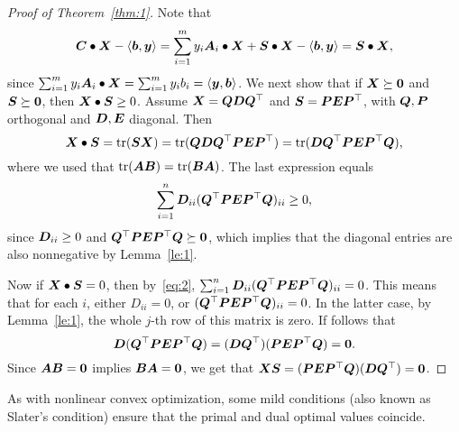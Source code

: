 \begin{proof}[Proof of Theorem~\ref{thm:1}]
Note that
\begin{equation*}
 \bm{C}\bullet\bm{X}-\langle {\bm{b}}, {\bm{y}} \rangle=\sum_{i=1}^m y_i \bm{A}_i\bullet \bm{X}+\bm{S}\bullet \bm{X}-\langle {\bm{b}}, {\bm{y}} \rangle = \bm{S}\bullet \bm{X},
\end{equation*}
since $\sum_{i=1}^m y_i \bm{A}_i\bullet \bm{X}=\sum_{i=1}^m y_ib_i=\langle {\bm{y}}, {\bm{b}} \rangle$.
 We next show that if $\bm{X}\succeq \bm{0}$ and $\bm{S}\succeq \bm{0}$, then $\bm{X}\bullet \bm{S}\geq 0$. Assume $\bm{X}=\bm{Q}\bm{D}\bm{Q}^{\top}$ and $\bm{S}=\bm{P}\bm{E}\bm{P}^{\top}$, with $\bm{Q},\bm{P}$ orthogonal and $\bm{D},\bm{E}$ diagonal. Then
 \begin{equation*}
  \bm{X}\bullet \bm{S} = \mathrm{tr}(\bm{S}\bm{X}) = \mathrm{tr}(\bm{Q}\bm{D}\bm{Q}^{\top}\bm{P}\bm{E}\bm{P}^{\top}) = \mathrm{tr}(\bm{D}\bm{Q}^{\top}\bm{PE}\bm{P}^{\top}\bm{Q}),
 \end{equation*}
where we used that $\mathrm{tr}(\bm{A}\bm{B})=\mathrm{tr}(\bm{B}\bm{A})$. The last expression equals 
\begin{equation}\label{eq:2}
 \sum_{i=1}^n \bm{D}_{ii} (\bm{Q}^{\top}\bm{PE}\bm{P}^{\top}\bm{Q})_{ii}\geq 0,
\end{equation}
since $\bm{D}_{ii}\geq 0$ and $\bm{Q}^{\top}\bm{PE}\bm{P}^{\top}\bm{Q}\succeq \bm{0}$, which implies that the diagonal entries are also nonnegative by Lemma~\ref{le:1}.

Now if $\bm{X}\bullet \bm{S}=0$, then by~\eqref{eq:2}, $\sum_{i=1}^n \bm{D}_{ii} (\bm{Q}^{\top}\bm{PE}\bm{P}^{\top}\bm{Q})_{ii}=0$. This means that for each $i$, either $D_{ii}=0$, or $(\bm{Q}^{\top}\bm{PE}\bm{P}^{\top}\bm{Q})_{ii}=0$. In the latter case, by Lemma~\ref{le:1}, the whole $j$-th row of this matrix is zero. If follows that
\begin{equation*}
 \bm{D}(\bm{Q}^{\top}\bm{PE}\bm{P}^{\top}\bm{Q})=(\bm{D}\bm{Q}^{\top})(\bm{PE}\bm{P}^{\top}\bm{Q})=\bm{0}.
\end{equation*}
Since $\bm{A}\bm{B}=\bm{0}$ implies $\bm{B}\bm{A}=\bm{0}$, we get that $\bm{X}\bm{S}=(\bm{PE}\bm{P}^{\top}\bm{Q})(\bm{D}\bm{Q}^{\top})=\bm{0}$.
\end{proof}

As with nonlinear convex optimization, some mild conditions (also known as Slater's condition) ensure that the primal and dual optimal values coincide. 


